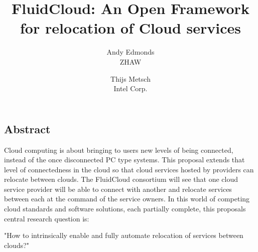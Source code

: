 \documentclass[letterpaper,twocolumn,10pt]{article}
\begin{document}
\date{}

\title{\Large \bf FluidCloud: An Open Framework for relocation of Cloud services}

\author{
{\rm Andy Edmonds}\\
ZHAW
\and
{\rm Thijs Metsch}\\
Intel Corp.
}

\maketitle

\thispagestyle{empty}

\subsection*{Abstract}
Cloud computing is about bringing to users new levels of being connected, 
instead of the once disconnected PC type systems.  This proposal extends 
that level of connectedness in the cloud so that cloud services hosted by 
providers can relocate between clouds. The FluidCloud consortium will see 
that one cloud service provider will be able to connect with another and 
relocate services between each at the command of the service owners.
In this world of competing cloud standards and software solutions, each 
partially complete, this proposals central research question is:

"How to intrinsically enable and fully automate relocation of services 
between clouds?"
\end{document}
